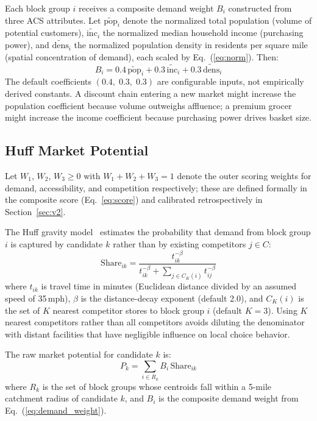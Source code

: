 \documentclass[conference]{IEEEtran}
\begin{document}
Each block group $i$ receives a composite demand weight $B_i$
constructed from three ACS attributes.  Let $\widetilde{\text{pop}}_i$
denote the normalized total population (volume of potential customers),
$\widetilde{\text{inc}}_i$ the normalized median household income
(purchasing power), and $\widetilde{\text{dens}}_i$ the normalized
population density in residents per square mile (spatial concentration
of demand), each scaled by Eq.~(\ref{eq:norm}).  Then:
\begin{equation}
B_i = 0.4\,\widetilde{\text{pop}}_i
    + 0.3\,\widetilde{\text{inc}}_i
    + 0.3\,\widetilde{\text{dens}}_i
\label{eq:demand_weight}
\end{equation}
The default coefficients $(0.4,\;0.3,\;0.3)$ are configurable inputs,
not empirically derived constants.  A discount chain entering a new
market might increase the population coefficient because volume
outweighs affluence; a premium grocer might increase the income
coefficient because purchasing power drives basket size.

\subsection{Huff Market Potential}

Let $W_1$, $W_2$, $W_3 \geq 0$ with $W_1 + W_2 + W_3 = 1$ denote the
outer scoring weights for demand, accessibility, and competition
respectively; these are defined formally in the composite score
(Eq.~\ref{eq:score}) and calibrated retrospectively in
Section~\ref{sec:v2}.

The Huff gravity model~\cite{Huff1964} estimates the probability that
demand from block group $i$ is captured by candidate $k$ rather than
by existing competitors $j \in C$:
\begin{equation}
\text{Share}_{ik} = \frac{t_{ik}^{-\beta}}
                         {t_{ik}^{-\beta}
                          + \sum_{j \in C_K(i)} t_{ij}^{-\beta}}
\label{eq:huff}
\end{equation}
where $t_{ik}$ is travel time in minutes (Euclidean distance divided by
an assumed speed of 35\,mph), $\beta$ is the distance-decay exponent
(default 2.0), and $C_K(i)$ is the set of $K$ nearest competitor stores
to block group $i$ (default $K = 3$).  Using $K$ nearest competitors
rather than all competitors avoids diluting the denominator with distant
facilities that have negligible influence on local choice behavior.

The raw market potential for candidate $k$ is:
\begin{equation}
P_k = \sum_{i \in R_k} B_i\,\text{Share}_{ik}
\label{eq:potential}
\end{equation}
where $R_k$ is the set of block groups whose centroids fall within a
5-mile catchment radius of candidate $k$, and $B_i$ is the composite
demand weight from Eq.~(\ref{eq:demand_weight}).
\end{document}
